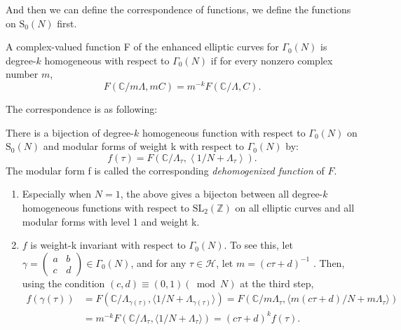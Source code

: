     And then we can define the correspondence of functions, we define the functions on  $\mathrm{S}_{0}(N)$ first. 

    \begin{definition}
        A complex-valued function  F  of the enhanced elliptic curves for  $\Gamma_{0}(N)$  is degree-$k$  homogeneous with respect to  $\Gamma_{0}(N)$  if for every nonzero complex number  $m$,
        $$F(\mathbb{C} / m \Lambda, m C) =m^{-k} F(\mathbb{C} / \Lambda, C) .$$
    \end{definition}

    The correspondence is as following:

    \begin{theorem}
        There is a bijection of degree-$k$  homogeneous function with respect to  $\Gamma_{0}(N)$ on $\mathrm{S}_{0}(N)$ and modular forms of weight k with respect to $\Gamma_{0}(N)$ by:
        $$f(\tau)=F\left(\mathbb{C} / \Lambda_{\tau},\left\langle 1 / N+\Lambda_{\tau}\right\rangle\right). $$ The modular form f is called the corresponding \textit{dehomogenized function} of $F$. 
    
    \end{theorem}

    \begin{remark}
        \begin{enumerate}
            \item Especially when $N=1$, the above gives  a bijecton between all degree-$k$  homogeneous functions with respect to  $\mathrm{SL}_2(\mathbb{Z})$ on all elliptic curves and all modular forms with level 1 and weight k.
            \item $f$  is weight-k  invariant with respect to  $\Gamma_{0}(N) $. To see this, let  $\gamma=\left(
                \begin{smallmatrix}
                a & b \\
                c & d
                \end{smallmatrix}
            \right) \in \Gamma_{0}(N)  $, and for any  $\tau \in \mathcal{H}$,  let  $m=(c \tau+d)^{-1}$ . Then, using the condition  $(c, d) \equiv(0,1)(\bmod N)$  at the third step,
            $$\begin{aligned}
            f(\gamma(\tau)) & =F\left(\mathbb{C} / \Lambda_{\gamma(\tau)}, \langle1 / N+\Lambda_{\gamma(\tau)}\rangle\right)=F\left(\mathbb{C} / m \Lambda_{\tau}, \langle m(c \tau+d) / N+m \Lambda_{\tau}\rangle\right) \\
            & =m^{-k} F\left(\mathbb{C} / \Lambda_{\tau},\langle 1 / N+\Lambda_{\tau}\rangle\right)=(c \tau+d)^{k} f(\tau) .
            \end{aligned}$$
        \end{enumerate}
    \end{remark}

